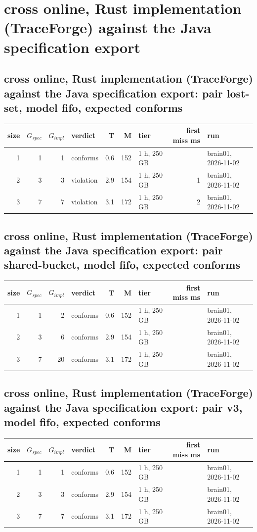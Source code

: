 \documentclass[10pt]{article}
\begin{document}
\section*{cross online, Rust implementation (TraceForge) against the Java specification export}
\subsection*{cross online, Rust implementation (TraceForge) against the Java specification export: pair \textsf{lost-set}, model fifo, expected conforms}
\begin{longtable}{@{}rrrlrrlrl@{}}
\toprule
size & $G_{\mathit{spec}}$ & $G_{\mathit{impl}}$ & verdict & T & M & tier & first miss ms & run \\
\midrule
\endhead
\color{red} 1 & 1 & 1 & conforms & 0.6 & 152 & 1 h, 250 GB &  & brain01, 2026-11-02 \\
\color{red} 2 & 3 & 3 & violation & 2.9 & 154 & 1 h, 250 GB & 1 & brain01, 2026-11-02 \\
\color{red} 3 & 7 & 7 & violation & 3.1 & 172 & 1 h, 250 GB & 2 & brain01, 2026-11-02 \\
\bottomrule
\end{longtable}
\subsection*{cross online, Rust implementation (TraceForge) against the Java specification export: pair \textsf{shared-bucket}, model fifo, expected conforms}
\begin{longtable}{@{}rrrlrrlrl@{}}
\toprule
size & $G_{\mathit{spec}}$ & $G_{\mathit{impl}}$ & verdict & T & M & tier & first miss ms & run \\
\midrule
\endhead
\color{red} 1 & 1 & 2 & conforms & 0.6 & 152 & 1 h, 250 GB &  & brain01, 2026-11-02 \\
\color{red} 2 & 3 & 6 & conforms & 2.9 & 154 & 1 h, 250 GB &  & brain01, 2026-11-02 \\
\color{red} 3 & 7 & 20 & conforms & 3.1 & 172 & 1 h, 250 GB &  & brain01, 2026-11-02 \\
\bottomrule
\end{longtable}
\subsection*{cross online, Rust implementation (TraceForge) against the Java specification export: pair \textsf{v3}, model fifo, expected conforms}
\begin{longtable}{@{}rrrlrrlrl@{}}
\toprule
size & $G_{\mathit{spec}}$ & $G_{\mathit{impl}}$ & verdict & T & M & tier & first miss ms & run \\
\midrule
\endhead
\color{red} 1 & 1 & 1 & conforms & 0.6 & 152 & 1 h, 250 GB &  & brain01, 2026-11-02 \\
\color{red} 2 & 3 & 3 & conforms & 2.9 & 154 & 1 h, 250 GB &  & brain01, 2026-11-02 \\
\color{red} 3 & 7 & 7 & conforms & 3.1 & 172 & 1 h, 250 GB &  & brain01, 2026-11-02 \\
\bottomrule
\end{longtable}
\end{document}
